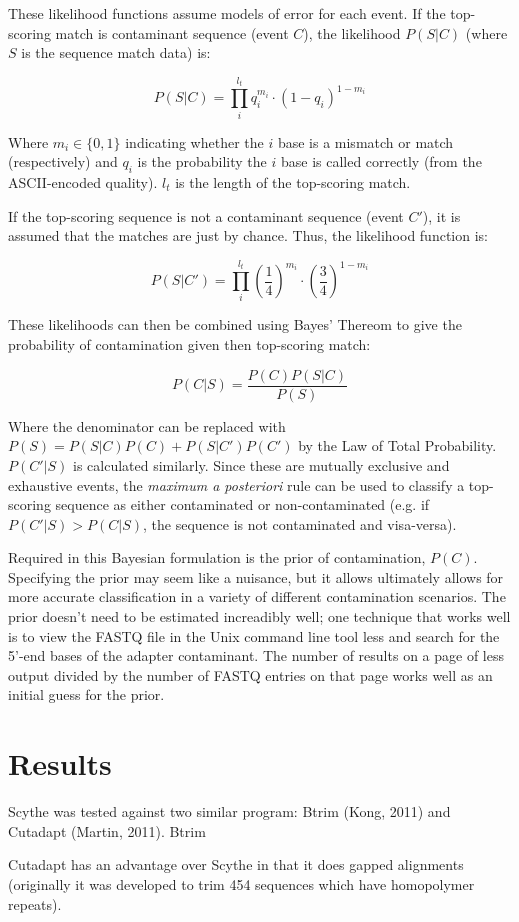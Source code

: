 \documentclass[11pt]{article}
\begin{document}
These likelihood functions assume models of error for each event. If
the top-scoring match is contaminant sequence (event $C$), the
likelihood $P(S | C)$ (where $S$ is the sequence match data) is:

$$ P(S | C) = \prod_i^{l_t} q_i^{m_i} \cdot (1-q_i)^{1 - m_i} $$

Where $m_i \in \{0, 1\}$ indicating whether the $i$ base is a
mismatch or match (respectively) and $q_i$ is the probability the $i$
base is called correctly (from the ASCII-encoded quality). $l_t$ is
the length of the top-scoring match.

If the top-scoring sequence is not a contaminant sequence (event
$C'$), it is assumed that the matches are just by chance. Thus, the
likelihood function is:

$$ P(S | C') = \prod_i^{l_t} \left(\frac{1}{4}\right)^{m_i} \cdot \left(\frac{3}{4}\right)^{1 - m_i} $$

These likelihoods can then be combined using Bayes' Thereom to give
the probability of contamination given then top-scoring match:

$$ P(C|S) = \frac{P(C) P(S|C)}{P(S)} $$

Where the denominator can be replaced with $P(S) = P(S | C)P(C) +
P(S | C') P(C')$ by the Law of Total Probability. $P(C'|S)$ is
calculated similarly. Since these are mutually exclusive and
exhaustive events, the \emph{maximum a posteriori} rule can be used to
classify a top-scoring sequence as either contaminated or
non-contaminated (e.g. if $P(C'|S) > P(C|S)$, the sequence is not
contaminated and visa-versa).

Required in this Bayesian formulation is the prior of contamination,
$P(C)$. Specifying the prior may seem like a nuisance, but it allows
ultimately allows for more accurate classification in a variety of
different contamination scenarios. The prior doesn't need to be
estimated increadibly well; one technique that works well is to view
the FASTQ file in the Unix command line tool less and search for the
5'-end bases of the adapter contaminant. The number of results on a
page of less output divided by the number of FASTQ entries on that
page works well as an initial guess for the prior.
\section{Results}
\label{sec-3}


Scythe was tested against two similar program: Btrim (Kong, 2011) and
Cutadapt (Martin, 2011). Btrim

Cutadapt has an advantage over Scythe in that it does gapped
alignments (originally it was developed to trim 454 sequences which
have homopolymer repeats).




\end{document}
